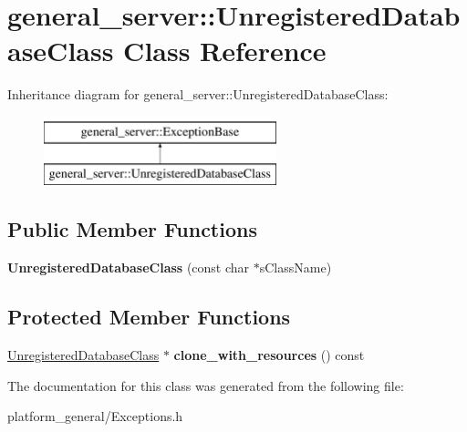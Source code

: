 \hypertarget{classgeneral__server_1_1UnregisteredDatabaseClass}{\section{general\-\_\-server\-:\-:\-Unregistered\-Database\-Class \-Class \-Reference}
\label{classgeneral__server_1_1UnregisteredDatabaseClass}
}
\-Inheritance diagram for general\-\_\-server\-:\-:\-Unregistered\-Database\-Class\-:\begin{figure}[H]
\begin{center}
\leavevmode
\includegraphics[height=2.000000cm]{classgeneral__server_1_1UnregisteredDatabaseClass}
\end{center}
\end{figure}
\subsection*{\-Public \-Member \-Functions}
\begin{DoxyCompactItemize}
\item 
\hypertarget{classgeneral__server_1_1UnregisteredDatabaseClass_a2a2a71e7f3d7aeebc3fd827b2405cbc1}{{\bfseries \-Unregistered\-Database\-Class} (const char $\ast$s\-Class\-Name)}\label{classgeneral__server_1_1UnregisteredDatabaseClass_a2a2a71e7f3d7aeebc3fd827b2405cbc1}

\end{DoxyCompactItemize}
\subsection*{\-Protected \-Member \-Functions}
\begin{DoxyCompactItemize}
\item 
\hypertarget{classgeneral__server_1_1UnregisteredDatabaseClass_a442ec59fba1239f4a23319da7e1a6b62}{\hyperlink{classgeneral__server_1_1UnregisteredDatabaseClass}{\-Unregistered\-Database\-Class} $\ast$ {\bfseries clone\-\_\-with\-\_\-resources} () const }\label{classgeneral__server_1_1UnregisteredDatabaseClass_a442ec59fba1239f4a23319da7e1a6b62}

\end{DoxyCompactItemize}


\-The documentation for this class was generated from the following file\-:\begin{DoxyCompactItemize}
\item 
platform\-\_\-general/\-Exceptions.\-h\end{DoxyCompactItemize}
